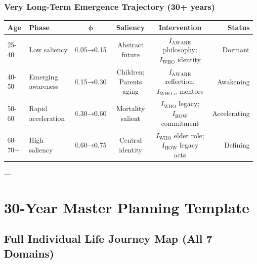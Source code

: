 \subsubsection{Very Long-Term Emergence Trajectory (30+ years)}

\begin{center}
\small
\begin{tabular}{@{}llcccr@{}}
\toprule
\textbf{Age} & \textbf{Phase} & $\boldsymbol{\phi}$ & \textbf{Saliency} & \textbf{Intervention} & \textbf{Status} \\
\midrule
25-40 & Low saliency & 0.05→0.15 & Abstract future & $I_{\text{AWARE}}$ philosophy; $I_{\text{WHO}}$ identity & Dormant \\
40-50 & Emerging awareness & 0.15→0.30 & Children; Parents aging & $I_{\text{AWARE}}$ reflection; $I_{\text{WHO},o}$ mentors & Awakening \\
50-60 & Rapid acceleration & 0.30→0.60 & Mortality salient & $I_{\text{WHO}}$ legacy; $I_{\text{HOW}}$ commitment & Accelerating \\
60-70+ & High saliency & 0.60→0.75 & Central identity & $I_{\text{WHO}}$ elder role; $I_{\text{HOW}}$ legacy acts & Defining \\
\midrule
\end{tabular}
\end{center}

---


\section{30-Year Master Planning Template}
\label{rrr:thirty-year}

\subsection{Full Individual Life Journey Map (All 7 Domains)}

